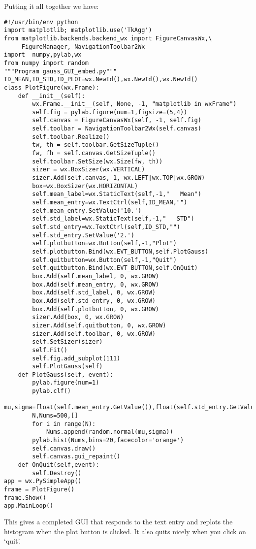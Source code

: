Putting it all together we have:
{\singlespacing \color{blue}\begin{verbatim}
#!/usr/bin/env python
import matplotlib; matplotlib.use('TkAgg')
from matplotlib.backends.backend_wx import FigureCanvasWx,\
     FigureManager, NavigationToolbar2Wx
import  numpy,pylab,wx
from numpy import random
"""Program gauss_GUI_embed.py"""
ID_MEAN,ID_STD,ID_PLOT=wx.NewId(),wx.NewId(),wx.NewId()
class PlotFigure(wx.Frame):
    def __init__(self):
        wx.Frame.__init__(self, None, -1, "matplotlib in wxFrame")
        self.fig = pylab.figure(num=1,figsize=(5,4))
        self.canvas = FigureCanvasWx(self, -1, self.fig)
        self.toolbar = NavigationToolbar2Wx(self.canvas)
        self.toolbar.Realize()
        tw, th = self.toolbar.GetSizeTuple()
        fw, fh = self.canvas.GetSizeTuple()
        self.toolbar.SetSize(wx.Size(fw, th))
        sizer = wx.BoxSizer(wx.VERTICAL)
        sizer.Add(self.canvas, 1, wx.LEFT|wx.TOP|wx.GROW)
        box=wx.BoxSizer(wx.HORIZONTAL)
        self.mean_label=wx.StaticText(self,-1,"   Mean")
        self.mean_entry=wx.TextCtrl(self,ID_MEAN,"")
        self.mean_entry.SetValue('10.')
        self.std_label=wx.StaticText(self,-1,"   STD")
        self.std_entry=wx.TextCtrl(self,ID_STD,"")
        self.std_entry.SetValue('2.')
        self.plotbutton=wx.Button(self,-1,"Plot")
        self.plotbutton.Bind(wx.EVT_BUTTON,self.PlotGauss)
        self.quitbutton=wx.Button(self,-1,"Quit")
        self.quitbutton.Bind(wx.EVT_BUTTON,self.OnQuit)
        box.Add(self.mean_label, 0, wx.GROW)
        box.Add(self.mean_entry, 0, wx.GROW)
        box.Add(self.std_label, 0, wx.GROW)
        box.Add(self.std_entry, 0, wx.GROW)
        box.Add(self.plotbutton, 0, wx.GROW)
        sizer.Add(box, 0, wx.GROW)
        sizer.Add(self.quitbutton, 0, wx.GROW)
        sizer.Add(self.toolbar, 0, wx.GROW)
        self.SetSizer(sizer)
        self.Fit()
        self.fig.add_subplot(111)
        self.PlotGauss(self)
    def PlotGauss(self, event):
        pylab.figure(num=1)
        pylab.clf()
        mu,sigma=float(self.mean_entry.GetValue()),float(self.std_entry.GetValue())
        N,Nums=500,[]
        for i in range(N):
            Nums.append(random.normal(mu,sigma))
        pylab.hist(Nums,bins=20,facecolor='orange')
        self.canvas.draw()
        self.canvas.gui_repaint()
    def OnQuit(self,event):
        self.Destroy()
app = wx.PySimpleApp()
frame = PlotFigure()
frame.Show()
app.MainLoop()
\end{verbatim}}


This gives a completed GUI that responds to the text entry and replots the histogram when the plot button is clicked. It also quits nicely when you click on `quit'.  

